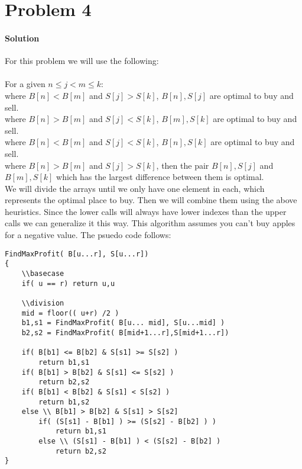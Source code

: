 \documentclass[12pt]{article}
\begin{document}
\section{Problem 4}

\paragraph{Solution}
For this problem we will use the following:\\
\\
For a given $n \leq j < m \leq k$:\\
 where $B[n] < B[m]$ and $S[j ] > S[k]$, $B[n], S[j]$ are optimal to buy and sell.\\
 where $B[n] > B[m]$ and $S[j] < S[k]$, $B[m], S[k]$ are optimal to buy and sell.\\
 where $B[n] < B[m]$ and $S[j] < S[k]$, $B[n], S[k]$ are optimal to buy and sell.\\
 where $B[n] > B[m]$ and $S[j] >S[k]$, then the pair $B[n],S[j]$ and $B[m],S[k]$ which has the largest difference between them is optimal.\\

We will divide the arrays until we only have one element in each, which represents the optimal place to buy.  Then we will combine them using the above heuristics.  Since the lower calls will always have lower indexes than the upper calls we can generalize it this way.  This algorithm assumes you can't buy apples for a negative value.  The psuedo code follows:


\begin{lstlisting}
FindMaxProfit( B[u...r], S[u...r])
{
	\\basecase
	if( u == r) return u,u
	
	\\division
	mid = floor(( u+r) /2 )
	b1,s1 = FindMaxProfit( B[u... mid], S[u...mid] )
	b2,s2 = FindMaxProfit( B[mid+1...r],S[mid+1...r])
	
	if( B[b1] <= B[b2] & S[s1] >= S[s2] )
		return b1,s1
	if( B[b1] > B[b2] & S[s1] <= S[s2] )
		return b2,s2
	if( B[b1] < B[b2] & S[s1] < S[s2] )
		return b1,s2
	else \\ B[b1] > B[b2] & S[s1] > S[s2]
		if( (S[s1] - B[b1] ) >= (S[s2] - B[b2] ) )
			return b1,s1
		else \\ (S[s1] - B[b1] ) < (S[s2] - B[b2] )
			return b2,s2
}
\end{lstlisting}
\end{document}
